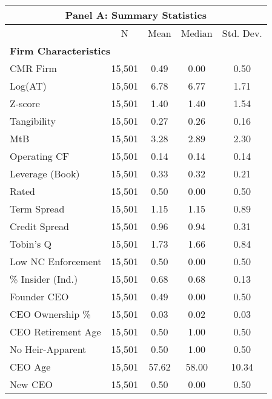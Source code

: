 {
\def\sym#1{\ifmmode^{#1}\else\(^{#1}\)\fi}
\begin{tabular}{l*{1}{cccc}}
\toprule
\multicolumn{5}{c}{\small \centering \textbf{Panel A}: Summary Statistics}\\ \midrule                    &           N&        Mean&      Median&   Std. Dev.\\
\midrule
\multicolumn{5}{l}{\textbf{Firm Characteristics}} \\ CMR Firm            &      15,501&        0.49&        0.00&        0.50\\
Log(AT)             &      15,501&        6.78&        6.77&        1.71\\
Z-score             &      15,501&        1.40&        1.40&        1.54\\
Tangibility         &      15,501&        0.27&        0.26&        0.16\\
MtB                 &      15,501&        3.28&        2.89&        2.30\\
Operating CF        &      15,501&        0.14&        0.14&        0.14\\
Leverage (Book)     &      15,501&        0.33&        0.32&        0.21\\
Rated               &      15,501&        0.50&        0.00&        0.50\\
Term Spread         &      15,501&        1.15&        1.15&        0.89\\
Credit Spread       &      15,501&        0.96&        0.94&        0.31\\
Tobin's Q           &      15,501&        1.73&        1.66&        0.84\\
Low NC Enforcement  &      15,501&        0.50&        0.00&        0.50\\
\% Insider (Ind.)   &      15,501&        0.68&        0.68&        0.13\\
Founder CEO         &      15,501&        0.49&        0.00&        0.50\\
CEO Ownership \%    &      15,501&        0.03&        0.02&        0.03\\
CEO Retirement Age  &      15,501&        0.50&        1.00&        0.50\\
No Heir-Apparent    &      15,501&        0.50&        1.00&        0.50\\
CEO Age             &      15,501&       57.62&       58.00&       10.34\\
New CEO             &      15,501&        0.50&        0.00&        0.50\\

\end{tabular}}
